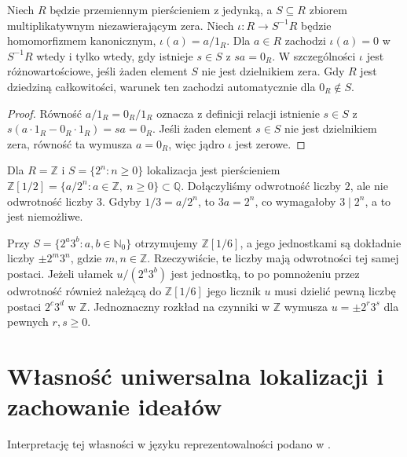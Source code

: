 \begin{stwierdzenie}
\label{aa:st:local-zero-kernel}
Niech $R$ będzie przemiennym pierścieniem z jedynką,
a $S\subseteq R$ zbiorem multiplikatywnym niezawierającym
zera. Niech $\iota:R\to S^{-1}R$ będzie homomorfizmem
kanonicznym, $\iota(a)=a/1_R$. Dla $a\in R$ zachodzi
$\iota(a)=0$ w $S^{-1}R$ wtedy i tylko wtedy,
gdy istnieje $s\in S$ z $sa=0_R$.
W szczególności $\iota$ jest różnowartościowe, jeśli
żaden element $S$ nie jest dzielnikiem zera.
Gdy $R$ jest dziedziną całkowitości, warunek ten zachodzi
automatycznie dla $0_R\notin S$.
\end{stwierdzenie}
\begin{proof}
Równość $a/1_R=0_R/1_R$ oznacza z definicji relacji
istnienie $s\in S$ z
$s(a\cdot1_R-0_R\cdot1_R)=sa=0_R$.
Jeśli żaden element $s\in S$ nie jest dzielnikiem zera,
równość ta wymusza $a=0_R$,
więc jądro $\iota$ jest zerowe.
\end{proof}

\begin{przyklad}
\label{aa:prz:local-z}
Dla $R=\mathbb Z$ i $S=\{2^n:n\ge0\}$
lokalizacja jest pierścieniem
$\mathbb Z[1/2]=\{a/2^n:a\in\mathbb Z,\ n\ge0\}\subset\mathbb Q$.
Dołączyliśmy odwrotność liczby $2$, ale nie
odwrotność liczby $3$. Gdyby $1/3=a/2^n$,
to $3a=2^n$, co wymagałoby $3\mid 2^n$,
a to jest niemożliwe.

Przy $S=\{2^a3^b:a,b\in\mathbb N_0\}$ otrzymujemy
$\mathbb Z[1/6]$, a jego jednostkami są dokładnie
liczby $\pm2^m3^n$, gdzie $m,n\in\mathbb Z$.
Rzeczywiście, te liczby mają odwrotności tej samej postaci.
Jeżeli ułamek $u/(2^a3^b)$ jest jednostką, to po
pomnożeniu przez odwrotność również należącą do
$\mathbb Z[1/6]$ jego licznik $u$ musi dzielić pewną
liczbę postaci $2^c3^d$ w $\mathbb Z$. Jednoznaczny
rozkład na czynniki w $\mathbb Z$ wymusza
$u=\pm2^r3^s$ dla pewnych $r,s\ge0$.
\end{przyklad}

\section{Własność uniwersalna lokalizacji i zachowanie ideałów}
Interpretację tej własności w języku reprezentowalności podano w .

